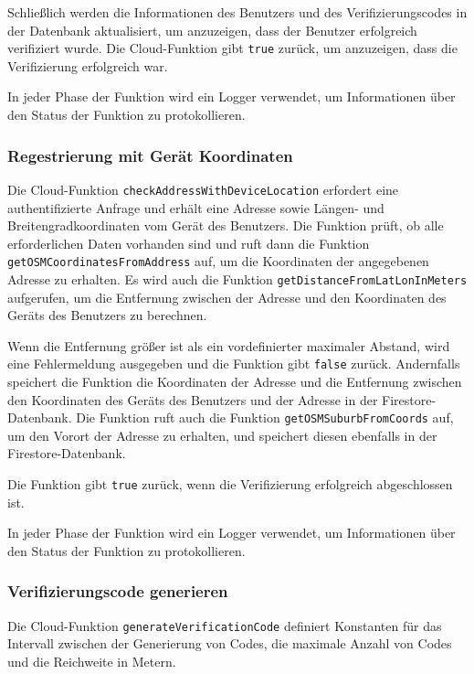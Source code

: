 Schließlich werden die Informationen des Benutzers und des Verifizierungscodes in der Datenbank aktualisiert, um anzuzeigen, dass der Benutzer erfolgreich verifiziert wurde. Die Cloud-Funktion gibt \texttt{true} zurück, um anzuzeigen, dass die Verifizierung erfolgreich war.

In jeder Phase der Funktion wird ein Logger verwendet, um Informationen über den Status der Funktion zu protokollieren.

\subsubsection{Regestrierung mit Gerät Koordinaten}

Die Cloud-Funktion \texttt{checkAddressWithDeviceLocation} erfordert eine authentifizierte Anfrage und erhält eine Adresse sowie Längen- und Breitengradkoordinaten vom Gerät des Benutzers. Die Funktion prüft, ob alle erforderlichen Daten vorhanden sind und ruft dann die Funktion \texttt{getOSMCoordinatesFromAddress} auf, um die Koordinaten der angegebenen Adresse zu erhalten. Es wird auch die Funktion \texttt{getDistanceFromLatLonInMeters} aufgerufen, um die Entfernung zwischen der Adresse und den Koordinaten des Geräts des Benutzers zu berechnen.

Wenn die Entfernung größer ist als ein vordefinierter maximaler Abstand, wird eine Fehlermeldung ausgegeben und die Funktion gibt \texttt{false} zurück. Andernfalls speichert die Funktion die Koordinaten der Adresse und die Entfernung zwischen den Koordinaten des Geräts des Benutzers und der Adresse in der Firestore-Datenbank. Die Funktion ruft auch die Funktion \texttt{getOSMSuburbFromCoords} auf, um den Vorort der Adresse zu erhalten, und speichert diesen ebenfalls in der Firestore-Datenbank.

Die Funktion gibt \texttt{true} zurück, wenn die Verifizierung erfolgreich abgeschlossen ist.

In jeder Phase der Funktion wird ein Logger verwendet, um Informationen über den Status der Funktion zu protokollieren.

\subsubsection{Verifizierungscode generieren}
Die Cloud-Funktion \texttt{generateVerificationCode} definiert Konstanten für das Intervall zwischen der Generierung von Codes, die maximale Anzahl von Codes und die Reichweite in Metern.

